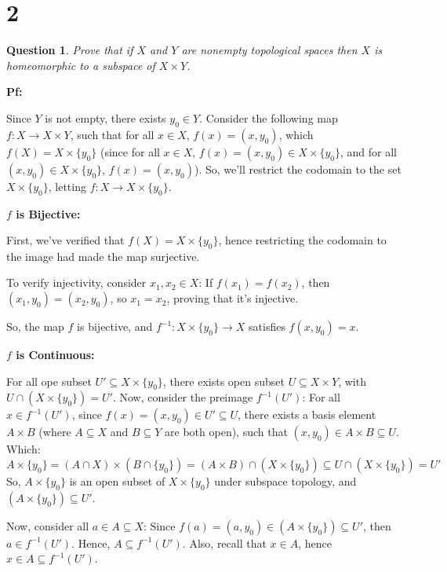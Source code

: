 \documentclass{article}
\newtheorem{question}{Question}
\begin{document}
\break

\section*{2}
\begin{myBox}[]{}
    \begin{question}
        Prove that if $X$ and $Y$ are nonempty topological spaces then 
        $X$ is homeomorphic to a subspace of $X\times Y$.
    \end{question}
\end{myBox}

\textbf{Pf:}

Since $Y$ is not empty, there exists $y_0\in Y$. Consider the following map $f:X\rightarrow X\times Y$, such that for all $x\in X$,
$f(x)=(x,y_0)$, which $f(X)=X\times \{y_0\}$ (since for all $x\in X$, $f(x)=(x,y_0)\in X\times \{y_0\}$, and for all $(x,y_0)\in X\times \{y_0\}$, $f(x)=(x,y_0)$).
So, we'll restrict the codomain to the set $X\times \{y_0\}$, letting $f:X\rightarrow X\times \{y_0\}$.

\hfill

\textbf{$f$ is Bijective:}

First, we've verified that $f(X)=X\times \{y_0\}$, hence restricting the codomain to the image had made the map surjective.

To verify injectivity, consider $x_1,x_2 \in X$: If $f(x_1)=f(x_2)$, then $(x_1,y_0)=(x_2,y_0)$, so $x_1=x_2$, proving that it's injective.

So, the map $f$ is bijective, and $f^{-1}:X\times \{y_0\}\rightarrow X$ satisfies $f(x,y_0)=x$.

\hfill

\textbf{$f$ is Continuous:}

For all ope subset $U'\subseteq X\times \{y_0\}$, there exists open subset $U\subseteq X\times Y$, with $U\cap (X\times \{y_0\}) = U'$.
Now, consider the preimage $f^{-1}(U')$: For all $x\in f^{-1}(U')$, since $f(x)=(x,y_0)\in U' \subseteq U$, there exists a basis element $A\times B$ 
(where $A\subseteq X$ and $B\subseteq Y$ are both open), such that $(x,y_0)\in A\times B \subseteq U$.
Which:
$$A\times \{y_0\} = (A\cap X)\times (B\cap \{y_0\}) = (A\times B)\cap (X\times \{y_0\}) \subseteq U\cap (X\times \{y_0\})=U'$$
So, $A\times \{y_0\}$ is an open subset of $X\times \{y_0\}$ under subspace topology, and $(A\times \{y_0\})\subseteq U'$.

Now, consider all $a\in A\subseteq X$: Since $f(a)=(a,y_0)\in (A\times \{y_0\})\subseteq U'$, then $a\in f^{-1}(U')$.
Hence, $A\subseteq f^{-1}(U')$. Also, recall that $x\in A$, hence $x\in A \subseteq f^{-1}(U')$. 
\end{document}

